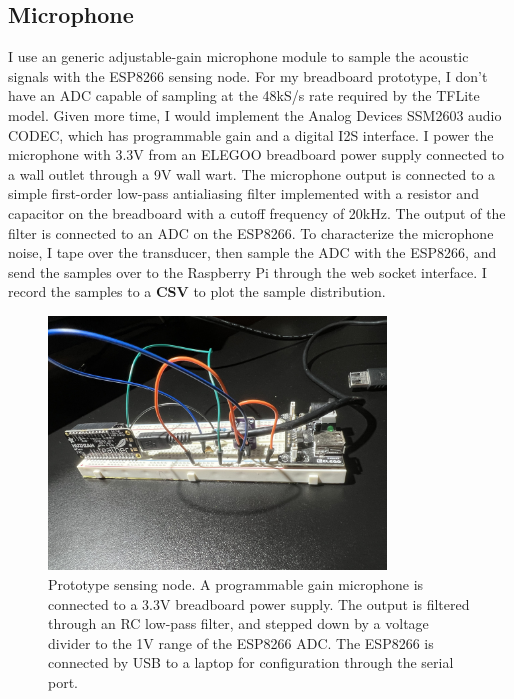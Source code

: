 \documentclass[12pt]{article}
\begin{document}
\subsection{Microphone}
	I use an generic adjustable-gain microphone module to sample the acoustic signals with the ESP8266 sensing node. For my breadboard prototype, I don't have an ADC capable of sampling at the 48kS/s rate required by the TFLite model. Given more time, I would implement the Analog Devices SSM2603 audio CODEC, which has programmable gain and a digital I2S interface. 
	I power the microphone with 3.3V from an ELEGOO breadboard power supply connected to a wall outlet through a 9V wall wart. The microphone output is connected to a simple first-order low-pass antialiasing filter implemented with a resistor and capacitor on the breadboard with a cutoff frequency of 20kHz. The output of the filter is connected to an ADC on the ESP8266.
	To characterize the microphone noise, I tape over the transducer, then sample the ADC with the ESP8266, and send the samples over to the Raspberry Pi through the web socket interface. I record the samples to a \textbf{CSV} to plot the sample distribution.
	
\begin{figure}[h]
\centering
\includegraphics[width=0.8\textwidth]{sensing_node.jpg} %
\caption{Prototype sensing node. A programmable gain microphone is connected to a 3.3V breadboard power supply. The output is filtered through an RC low-pass filter, and stepped down by a voltage divider to the 1V range of the ESP8266 ADC. The ESP8266 is connected by USB to a laptop for configuration through the serial port.}
\label{fig:sensing_node}
\end{figure}
\end{document}
